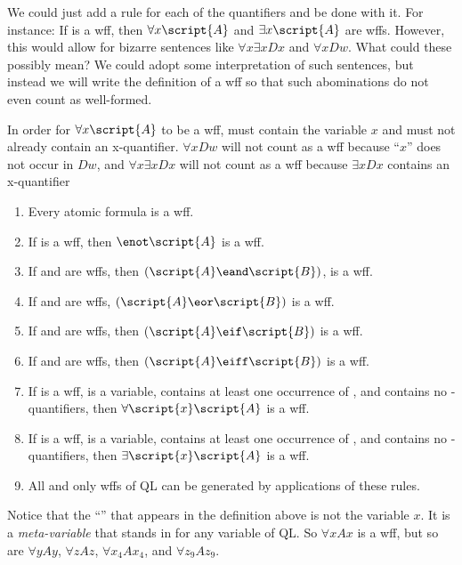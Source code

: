 We could just add a rule for each of the quantifiers and be done with it. For instance: If  is a wff, then $\forall x\script{A}$ and $\exists x\script{A}$ are wffs. However, this would allow for bizarre sentences like $\forall x\exists x Dx$ and $\forall x Dw$. What could these possibly mean? We could adopt some interpretation of such sentences, but instead we will write the definition of a wff so that such abominations do not even count as well-formed. 

In order for $\forall x\script{A}$ to be a wff,  must contain the variable $x$ and must not already contain an x-quantifier. $\forall x Dw$ will not count as a wff because ``$x$'' does not occur in $Dw$, and $\forall x \exists x Dx$ will not count as a wff because $\exists x Dx$ contains an x-quantifier

\begin{enumerate}
\item Every atomic formula is a wff.
\item If  is a wff, then $\enot\script{A}$ is a wff.
\item If  and  are wffs, then $(\script{A}\eand\script{B})$, is a wff.
\item If  and  are wffs, $(\script{A}\eor\script{B})$ is a wff.
\item If  and  are wffs, then $(\script{A}\eif\script{B})$ is a wff.
\item If  and  are wffs, then $(\script{A}\eiff\script{B})$ is a wff.
\item If  is a wff,  is a variable,  contains at least one occurrence of , and  contains no -quantifiers, then $\forall\script{x}\script{A}$ is a wff.
\item If  is a wff,  is a variable,  contains at least one occurrence of , and  contains no -quantifiers, then $\exists\script{x}\script{A}$ is a wff.
\item All and only wffs of QL can be generated by applications of these rules.
\end {enumerate}

Notice that the ``'' that appears in the definition above is not the variable $x$. It is a \emph{meta-variable} that stands in for any variable of QL. So $\forall xAx$ is a wff, but so are $\forall yAy$, $\forall zAz$, $\forall x_4Ax_4$, and $\forall z_9Az_9$.

